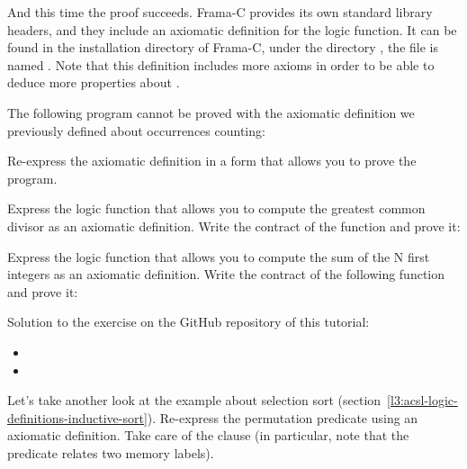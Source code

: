 

And this time the proof succeeds. Frama-C provides its own standard
library headers, and they include an
axiomatic definition for the  logic function. It can
be found in the installation directory of Frama-C, under the directory
, the file is named .
Note that this definition includes more axioms in order to be able to
deduce more properties about .






The following program cannot be proved with the axiomatic definition we
previously defined about occurrences counting:




Re-express the axiomatic definition in a form that allows you to prove the
program.






Express the logic function that allows you to compute the greatest common divisor as
an axiomatic definition. Write the contract of the  function and
prove it:








Express the logic function that allows you to compute the sum of the N first
integers as an axiomatic definition. Write the contract of the following
 function and prove it:



\begin{Information}
  Solution to the exercise on the GitHub repository of this tutorial:
  \begin{itemize}
    \item {}
    \item {}
  \end{itemize}
\end{Information}




Let's take another look at the example about selection sort
(section~\ref{l3:acsl-logic-definitions-inductive-sort}). Re-express the
permutation predicate using an axiomatic definition. Take care of the
 clause (in particular, note that the predicate relates
two memory labels).




